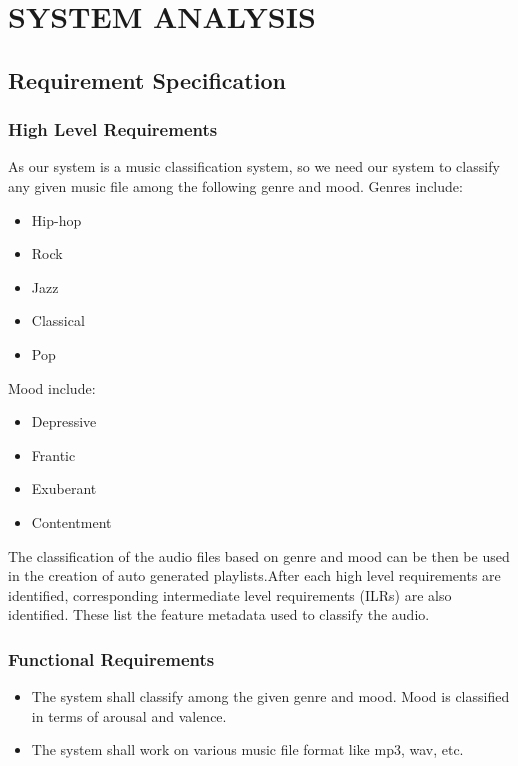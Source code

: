 \newpage
\section{SYSTEM ANALYSIS}
\subsection{Requirement Specification}
\subsubsection{High Level Requirements}
As our system is a music classification system, so we need our system to classify any given music file among the following genre and mood.
Genres include:
    \begin{itemize}
    \item Hip-hop
    \item Rock
    \item Jazz
    \item Classical
    \item Pop
    \end{itemize}
Mood include:
    \begin{itemize}
    \item Depressive
    \item Frantic
    \item Exuberant
    \item Contentment
    \end{itemize}
    The classification of the audio files based on genre and mood can be then be used in the creation of auto generated playlists.After each high level requirements are identified, corresponding intermediate level requirements
    (ILRs) are also identified. These list the feature metadata used to classify the audio.
\newpage
\subsubsection{Functional Requirements}
\begin{itemize}
        \item The system shall classify among the given genre and mood. Mood is classified in terms of arousal and valence. 
        \item The system shall work on various music file format like mp3, wav, etc.
        \end{itemize}

